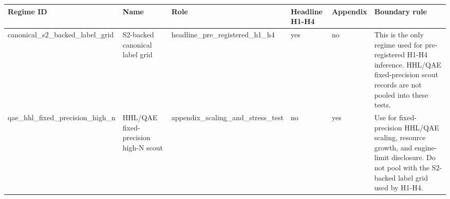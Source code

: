 \begin{tabular}{llllll}
\toprule
Regime ID & Name & Role & Headline H1-H4 & Appendix & Boundary rule \\
\midrule
canonical\_s2\_backed\_label\_grid & S2-backed canonical label grid & headline\_pre\_registered\_h1\_h4 & yes & no & This is the only regime used for pre-registered H1-H4 inference. HHL/QAE fixed-precision scout records are not pooled into these tests. \\
qae\_hhl\_fixed\_precision\_high\_n & HHL/QAE fixed-precision high-N scout & appendix\_scaling\_and\_stress\_test & no & yes & Use for fixed-precision HHL/QAE scaling, resource growth, and engine-limit disclosure. Do not pool with the S2-backed label grid used by H1-H4. \\
\bottomrule
\end{tabular}

